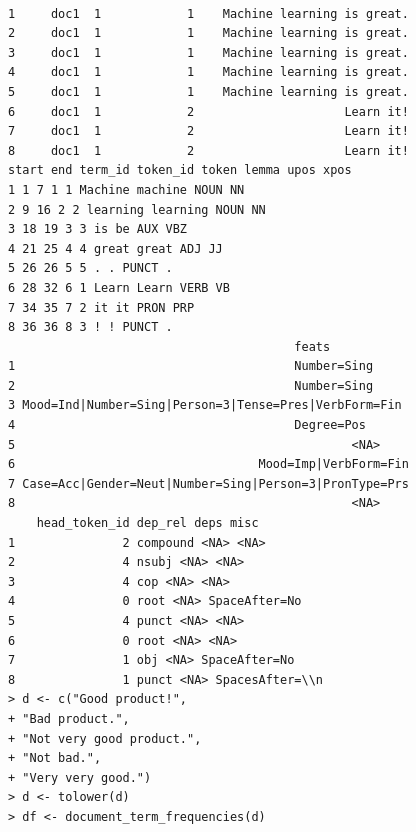 \documentclass[11pt,openany,executivepaper]{book}
\begin{document}
\begin{verbatim}

1     doc1  1            1    Machine learning is great.
2     doc1  1            1    Machine learning is great.
3     doc1  1            1    Machine learning is great.
4     doc1  1            1    Machine learning is great.
5     doc1  1            1    Machine learning is great.
6     doc1  1            2                     Learn it!
7     doc1  1            2                     Learn it!
8     doc1  1            2                     Learn it!
start end term_id token_id token lemma upos xpos
1 1 7 1 1 Machine machine NOUN NN
2 9 16 2 2 learning learning NOUN NN
3 18 19 3 3 is be AUX VBZ
4 21 25 4 4 great great ADJ JJ
5 26 26 5 5 . . PUNCT .
6 28 32 6 1 Learn Learn VERB VB
7 34 35 7 2 it it PRON PRP
8 36 36 8 3 ! ! PUNCT .
                                        feats
1                                       Number=Sing
2                                       Number=Sing
3 Mood=Ind|Number=Sing|Person=3|Tense=Pres|VerbForm=Fin
4                                       Degree=Pos
5                                               <NA>
6                                  Mood=Imp|VerbForm=Fin
7 Case=Acc|Gender=Neut|Number=Sing|Person=3|PronType=Prs
8                                               <NA>
    head_token_id dep_rel deps misc
1               2 compound <NA> <NA>
2               4 nsubj <NA> <NA>
3               4 cop <NA> <NA>
4               0 root <NA> SpaceAfter=No
5               4 punct <NA> <NA>
6               0 root <NA> <NA>
7               1 obj <NA> SpaceAfter=No
8               1 punct <NA> SpacesAfter=\\n
> d <- c("Good product!",
+ "Bad product.",
+ "Not very good product.",
+ "Not bad.",
+ "Very very good.")
> d <- tolower(d)
> df <- document_term_frequencies(d)
\end{verbatim}
\end{document}
